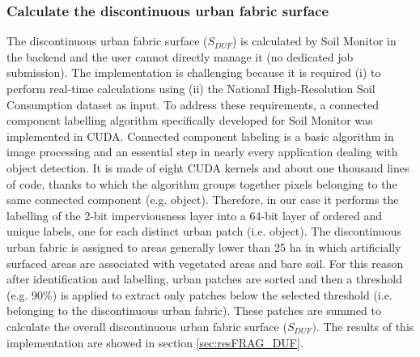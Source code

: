 \documentclass[APA,LATO1COL,doublespace]{WileyNJD-v2}
\newcommand{\toberevised}[1]{\emph{\textcolor{red}{#1}}} %
\begin{document}
\subsubsection{ Calculate the discontinuous urban fabric surface }
\label{sec:mmDUF}
The discontinuous urban fabric surface ($S_{DUF}$) is calculated by Soil Monitor in the backend and the user cannot directly manage it (no dedicated job submission). %
The implementation is challenging because it is required (i) to perform real-time calculations using (ii) the National High-Resolution Soil Consumption dataset as input.
To address these requirements, a connected component labelling algorithm specifically developed for Soil Monitor was implemented in CUDA.
Connected component labeling is a basic algorithm in image processing and an essential step in nearly every application dealing with object detection.
It is made of eight CUDA kernels and about one thousand lines of code, thanks to which the algorithm groups together pixels belonging to the same connected component (e.g. object).
Therefore, in our case it performs the labelling of the 2-bit imperviousness layer into a 64-bit layer of ordered and unique labels, one for each distinct urban patch (i.e. object).
The discontinuous urban fabric is assigned to areas generally lower than 25 ha in which artificially surfaced areas are associated with vegetated areas and bare soil.
For this reason after identification and labelling, urban patches are sorted and then a threshold (e.g. 90\%) is applied to extract only patches below the selected threshold (i.e. belonging to the discontinuous urban fabric). %
These patches are summed to calculate the overall discontinuous urban fabric surface ($S_{DUF})$.
The results of this implementation are showed in section \ref{sec:resFRAG_DUF}.
\end{document}
